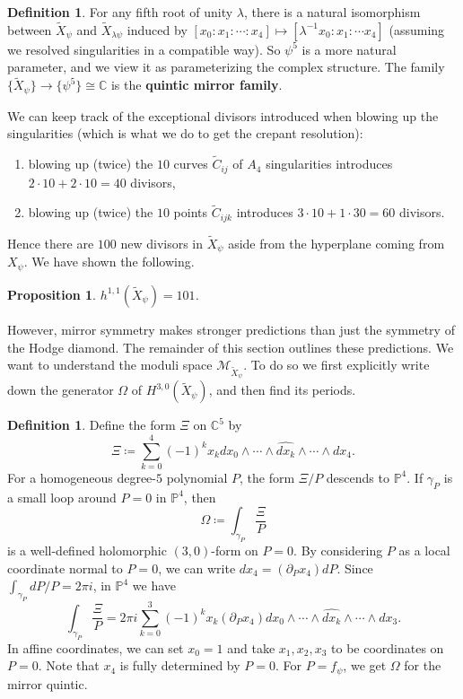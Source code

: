\documentclass{report}
\theoremstyle{plain}
\newtheorem{proposition}[theorem]{Proposition}
\theoremstyle{definition}
\newtheorem{definition}[theorem]{Definition}
\theoremstyle{remark}
\newcommand{\di}{\partial}
\newcommand{\bC}{\mathbb{C}}
\newcommand{\bP}{\mathbb{P}}
\newcommand{\cM}{\mathcal{M}}
\begin{document}
\begin{definition}
  For any fifth root of unity $\lambda$, there is a natural
  isomorphism between $\tilde{X}_{\psi}$ and $\tilde{X}_{\lambda\psi}$
  induced by $[x_0 : x_1 : \cdots : x_4] \mapsto [\lambda^{-1}x_0 :
    x_1 : \cdots x_4]$ (assuming we resolved singularities in a
  compatible way). So $\psi^5$ is a more natural parameter, and we
  view it as parameterizing the complex structure. The family
  $\{\tilde{X}_{\psi}\} \to \{\psi^5\} \cong \bC$ is the {\bf quintic
    mirror family}.
\end{definition}

We can keep track of the exceptional divisors introduced when blowing
up the singularities (which is what we do to get the crepant
resolution):
\begin{enumerate}
\item blowing up (twice) the $10$ curves $\tilde{C}_{ij}$ of $A_4$
  singularities introduces $2 \cdot 10 + 2 \cdot 10 = 40$ divisors,
\item blowing up (twice) the $10$ points $\tilde{C}_{ijk}$ introduces
  $3 \cdot 10 + 1 \cdot 30 = 60$ divisors.
\end{enumerate}
Hence there are $100$ new divisors in $\tilde{X}_\psi$ aside from the
hyperplane coming from $X_\psi$. We have shown the following.

\begin{proposition}
  $h^{1,1}(\tilde{X}_\psi) = 101$.
\end{proposition}

However, mirror symmetry makes stronger predictions than just the
symmetry of the Hodge diamond. The remainder of this section outlines
these predictions. We want to understand the moduli space
$\cM_{\tilde{X}_{\psi}}$. To do so we first explicitly write down the
generator $\Omega$ of $H^{3,0}(\tilde{X}_\psi)$, and then find its
periods.

\begin{definition}
  Define the form $\Xi$ on $\bC^5$ by
  \[ \Xi \coloneqq \sum_{k=0}^4 (-1)^k x_k dx_0 \wedge \cdots \wedge \widehat{dx_k} \wedge \cdots \wedge dx_4. \]
  For a homogeneous degree-$5$ polynomial $P$, the form $\Xi/P$
  descends to $\bP^4$. If $\gamma_P$ is a small loop around $P=0$ in
  $\bP^4$, then
  \[ \Omega \coloneqq \int_{\gamma_P} \frac{\Xi}{P} \]
  is a well-defined holomorphic $(3,0)$-form on $P=0$. By considering
  $P$ as a local coordinate normal to $P=0$, we can write $dx_4 =
  (\di_P x_4) dP$. Since $\int_{\gamma_P} dP/P = 2\pi i$, in $\bP^4$
  we have
  \[ \int_{\gamma_P} \frac{\Xi}{P} = 2\pi i\sum_{k=0}^3 (-1)^k x_k (\di_P x_4) dx_0 \wedge \cdots \wedge \widehat{dx_k} \wedge \cdots \wedge dx_3. \]
  In affine coordinates, we can set $x_0 = 1$ and take $x_1, x_2, x_3$
  to be coordinates on $P = 0$. Note that $x_4$ is fully determined by
  $P=0$. For $P = f_\psi$, we get $\Omega$ for the mirror quintic.
\end{definition}
\end{document}
